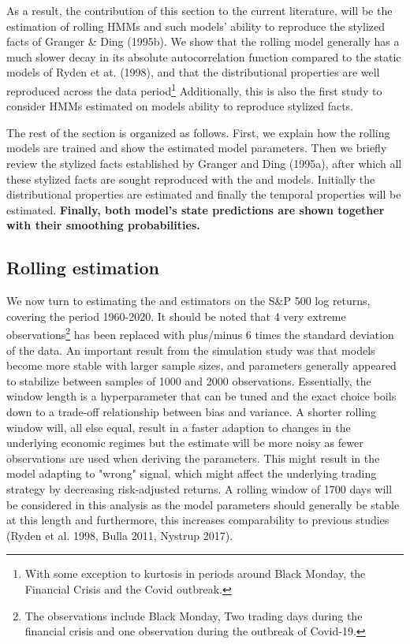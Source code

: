 As a result, the contribution of this section to the current literature, will be the estimation of rolling HMMs and such models' ability to reproduce the stylized facts of Granger \& Ding (1995b). We show that the rolling model generally has a much slower decay in its absolute autocorrelation function compared to the static models of Ryden et at. (1998), and that the distributional properties are well reproduced across the data period\footnote{
With some exception to kurtosis in periods around Black Monday, the Financial Crisis and the Covid outbreak.
}
Additionally, this is also the first study to consider HMMs estimated on \jump models ability to reproduce stylized facts.

The rest of the section is organized as follows. First, we explain how the rolling models are trained and show the estimated model parameters. Then we briefly review the stylized facts established by Granger and Ding (1995a), after which all these stylized facts are sought reproduced with the \mle and \jump models. Initially the distributional properties are estimated and finally the temporal properties will be estimated. \textbf{Finally, both model's state predictions are shown together with their smoothing probabilities.}

\subsection{Rolling estimation}
\label{Sec: rolling estimation}

We now turn to estimating the \mle and \jump estimators on the S\&P 500 log returns, covering the period 1960-2020. It should be noted that 4 very extreme observations\footnote{The observations include Black Monday, Two trading days during the financial crisis and one observation during the outbreak of Covid-19.
}
has been replaced with plus/minus 6 times the standard deviation of the data. An important result from the simulation study was that models become more stable with larger sample sizes, and parameters generally appeared to stabilize between samples of 1000 and 2000 observations. Essentially, the window length is a hyperparameter that can be tuned and the exact choice boils down to a trade-off relationship between bias and variance. A shorter rolling window will, all else equal, result in a faster adaption to changes in the underlying economic regimes but the estimate will be more noisy as fewer observations are used when deriving the parameters. This might result in the model adapting to "wrong" signal, which might affect the underlying trading strategy by decreasing risk-adjusted returns. A rolling window of 1700 days will be considered in this analysis as the model parameters should generally be stable at this length and furthermore, this increases comparability to previous studies (Ryden et al. 1998, Bulla 2011, Nystrup 2017).

